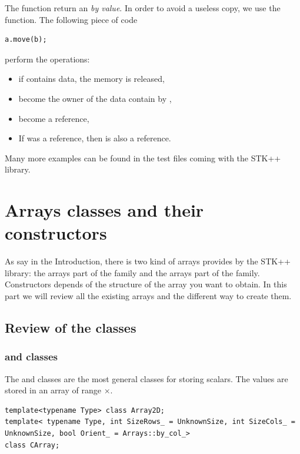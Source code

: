 \documentclass[a4paper,10pt]{article}
\begin{document}
The  function return an  \emph{by value}. In
order to avoid a useless copy, we use the  function. The following
piece of code
\begin{lstlisting}[style=customcpp]
a.move(b);
\end{lstlisting}
perform the operations:
\begin{itemize}
\item if  contains data, the memory is released,
\item {} become the owner of the data contain by ,
\item {} become a reference,
\item If  was a reference, then   is also a reference.
\end{itemize}

\begin{note}
Many more examples can be found in the test files coming with the STK++ library.
\end{note}

\section{Arrays classes and their constructors}

As say in the Introduction, there is two kind of arrays provides by the STK++ library: the
arrays part of the  family and the arrays part of the  family.
Constructors depends of the structure of the array you want to obtain. In
this part we will review all the existing arrays and the different way
to create them.


\subsection{Review of the classes}

\subsubsection{ and  classes}
The  and  classes are the most general
classes for storing scalars. The values are stored in an array of range
\code{[beginRows:endRows)}$\times$\code{[beginCols:endCols)}.

\begin{lstlisting}[style=customcpp]
template<typename Type> class Array2D;
template< typename Type, int SizeRows_ = UnknownSize, int SizeCols_ = UnknownSize, bool Orient_ = Arrays::by_col_>
class CArray;
\end{lstlisting}
\end{document}
